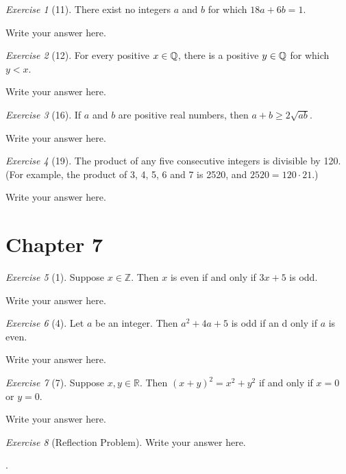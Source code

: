 \documentclass[12pt]{amsart}
\makeatletter
\theoremstyle{remark}
\newtheorem*{exercise}{Exercise}%
\def\RR{\ensuremath{\mathbb R}}
\def\ZZ{\ensuremath{\mathbb Z}}
\def\QQ{{\ensuremath\mathbb Q}}
\renewenvironment{proof}[1][\proofname]{\par\doublespacing
  \pushQED{\qed}%
  \normalfont \topsep6\p@\@plus6\p@\relax
  \list{}{%
    \settowidth{\leftmargin}{\itshape\proofname:\hskip\labelsep}%
    \setlength{\labelwidth}{0pt}%
    \setlength{\itemindent}{-\leftmargin}%
  }%
  \item[\hskip\labelsep\itshape#1\@addpunct{:}]\ignorespaces
}{%
  \popQED\endlist\@endpefalse
  \singlespacing
}
\theoremstyle{mycomment}
\makeatother
\begin{document}
\begin{exercise}[11] There exist no integers $a$ and $b$ for which $18a+6b=1$.
\begin{proof}
Write your answer here.
\end{proof}
\end{exercise}

\begin{exercise}[12] For every positive $x\in\QQ$, there is a positive $y\in\QQ$ for which $y<x$.
\begin{proof}
Write your answer here.
\end{proof}
\end{exercise}

\begin{exercise}[16] If $a$ and $b$ are positive real numbers, then $a+b\ge 2\sqrt{ab}$.
\begin{proof}
Write your answer here.
\end{proof}
\end{exercise}

\begin{exercise}[19] The product of any five consecutive integers is divisible by 120. (For example, the product of 3, 4, 5, 6 and 7 is 2520, and $2520=120\cdot 21$.)
\begin{proof}
Write your answer here.
\end{proof}
\end{exercise}

\section*{Chapter 7}
\begin{exercise}[1] Suppose $x\in\ZZ$. Then $x$ is even if and only if $3x+5$ is odd.
\begin{proof}
Write your answer here.
\end{proof}
\end{exercise}
\begin{exercise}[4] Let $a$ be an integer. Then $a^{2}+4a+5$ is odd if an d only if $a$ is even.
\begin{proof}
Write your answer here.
\end{proof}
\end{exercise}
\begin{exercise}[7] Suppose $x,y\in\RR$. Then $(x+y)^{2}=x^{2}+y^{2}$ if and only if $x=0$ or $y=0$.
\begin{proof}
Write your answer here.
\end{proof}
\end{exercise}

\begin{exercise}[Reflection Problem]
\begin{proof}
Write your answer here.
\end{proof}
\end{exercise}.















 
\end{document}
